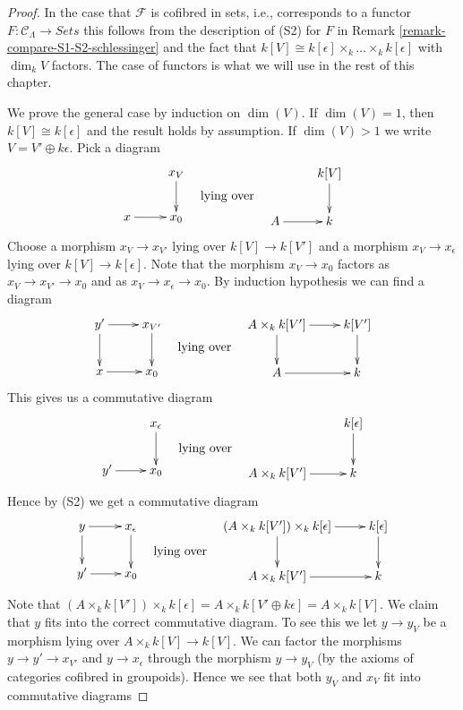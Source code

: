 \documentclass[10pt,a4paper]{amsart}
\theoremstyle{plain}
\theoremstyle{definition}
\theoremstyle{remark}
\numberwithin{equation}{subsection}
\begin{document}
\begin{proof}
In the case that $\mathcal{F}$ is cofibred in sets, i.e., corresponds
to a functor $F : \mathcal{C}_\Lambda \to \textit{Sets}$ this follows
from the description of (S2) for $F$ in
Remark \ref{remark-compare-S1-S2-schlessinger}
and the fact that
$k[V] \cong k[\epsilon] \times_k \ldots \times_k k[\epsilon]$
with $\dim_k V$ factors. The case of functors is what we will use in
the rest of this chapter.

\medskip\noindent
We prove the general case by induction on $\dim(V)$. If $\dim(V) = 1$, then
$k[V] \cong k[\epsilon]$ and the result holds by assumption.
If $\dim(V) > 1$ we write $V = V' \oplus k\epsilon$. Pick a diagram
$$
\vcenter{
\xymatrix{
& x_V \ar[d] \\
x \ar[r] & x_0
}
}
\quad\text{lying over}\quad
\vcenter{
\xymatrix{
& k[V] \ar[d] \\
A \ar[r] & k
}
}
$$
Choose a morphism $x_V \to x_{V'}$ lying over $k[V] \to k[V']$
and a morphism $x_V \to x_\epsilon$ lying over $k[V] \to k[\epsilon]$.
Note that the morphism $x_V \to x_0$ factors as
$x_V \to x_{V'} \to x_0$ and as $x_V \to x_\epsilon \to x_0$.
By induction hypothesis we can find a diagram
$$
\vcenter{
\xymatrix{
y' \ar[d] \ar[r] & x_{V'} \ar[d] \\
x \ar[r] & x_0
}
}
\quad\text{lying over}\quad
\vcenter{
\xymatrix{
A \times_k k[V'] \ar[d] \ar[r] & k[V'] \ar[d] \\
A \ar[r] & k
}
}
$$
This gives us a commutative diagram
$$
\vcenter{
\xymatrix{
& x_\epsilon \ar[d] \\
y' \ar[r] & x_0
}
}
\quad\text{lying over}\quad
\vcenter{
\xymatrix{
& k[\epsilon] \ar[d] \\
A \times_k k[V'] \ar[r] & k
}
}
$$
Hence by (S2) we get a commutative diagram
$$
\vcenter{
\xymatrix{
y \ar[d] \ar[r] & x_\epsilon \ar[d] \\
y' \ar[r] & x_0
}
}
\quad\text{lying over}\quad
\vcenter{
\xymatrix{
(A \times_k k[V']) \times_k k[\epsilon] \ar[d] \ar[r] & k[\epsilon] \ar[d] \\
A \times_k k[V'] \ar[r] & k
}
}
$$
Note that
$(A \times_k k[V']) \times_k k[\epsilon] = A \times_k k[V' \oplus k\epsilon]
= A \times_k k[V]$. We claim that $y$ fits into the correct commutative
diagram. To see this we let $y \to y_V$ be a morphism lying over
$A \times_k k[V] \to k[V]$. We can factor the morphisms
$y \to y' \to x_{V'}$ and $y \to x_\epsilon$ through the morphism
$y \to y_V$ (by the axioms of categories cofibred in groupoids).
Hence we see that both $y_V$ and $x_V$ fit into commutative diagrams

\end{proof}
\end{document}
